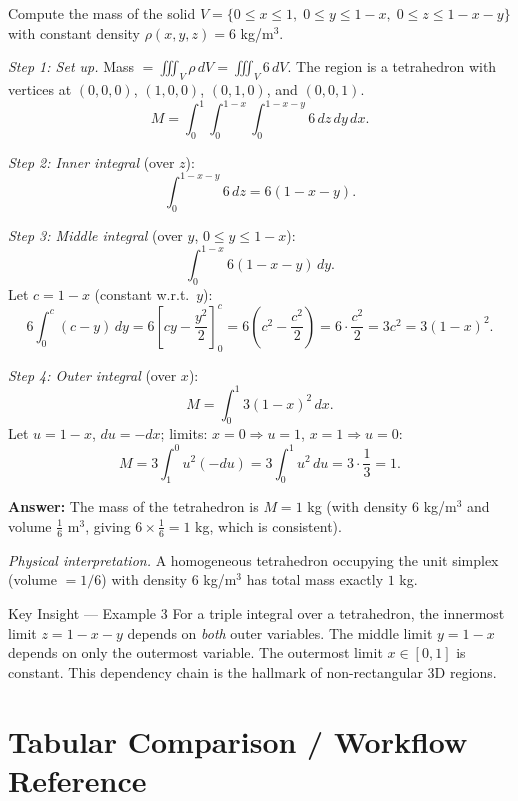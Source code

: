 \documentclass[12pt,a4paper]{article}
\begin{document}
Compute the mass of the solid \(V = \{0 \le x \le 1,\; 0 \le y \le 1-x,\; 0 \le z \le 1-x-y\}\) with constant density \(\rho(x,y,z) = 6\) kg/m\(^3\).

\textit{Step 1: Set up.} Mass \(= \iiint_V \rho\,dV = \iiint_V 6\,dV\). The region is a tetrahedron with vertices at \((0,0,0)\), \((1,0,0)\), \((0,1,0)\), and \((0,0,1)\).
\[
  M = \int_0^1 \int_0^{1-x} \int_0^{1-x-y} 6\,dz\,dy\,dx.
\]

\textit{Step 2: Inner integral} (over \(z\)):
\[
  \int_0^{1-x-y} 6\,dz = 6(1-x-y).
\]

\textit{Step 3: Middle integral} (over \(y\), \(0 \le y \le 1-x\)):
\[
  \int_0^{1-x} 6(1-x-y)\,dy.
\]
Let \(c = 1-x\) (constant w.r.t.\ \(y\)):
\[
  6\int_0^{c}(c-y)\,dy = 6\left[cy - \frac{y^2}{2}\right]_0^c = 6\left(c^2 - \frac{c^2}{2}\right) = 6\cdot\frac{c^2}{2} = 3c^2 = 3(1-x)^2.
\]

\textit{Step 4: Outer integral} (over \(x\)):
\[
  M = \int_0^1 3(1-x)^2\,dx.
\]
Let \(u = 1-x\), \(du = -dx\); limits: \(x=0\Rightarrow u=1\), \(x=1\Rightarrow u=0\):
\[
  M = 3\int_1^0 u^2(-du) = 3\int_0^1 u^2\,du = 3\cdot\frac{1}{3} = 1.
\]

\textbf{Answer:} The mass of the tetrahedron is \(M = 1\) kg (with density \(6\) kg/m\(^3\) and volume \(\frac{1}{6}\) m\(^3\), giving \(6 \times \frac{1}{6} = 1\) kg, which is consistent).

\textit{Physical interpretation.} A homogeneous tetrahedron occupying the unit simplex (volume \(= 1/6\)) with density \(6\) kg/m\(^3\) has total mass exactly \(1\) kg.

\begin{learnbox}{Key Insight --- Example 3}
For a triple integral over a tetrahedron, the innermost limit \(z = 1-x-y\) depends on \emph{both} outer variables. The middle limit \(y = 1-x\) depends on only the outermost variable. The outermost limit \(x \in [0,1]\) is constant. This dependency chain is the hallmark of non-rectangular 3D regions.
\end{learnbox}

\section{Tabular Comparison / Workflow Reference}
\end{document}

